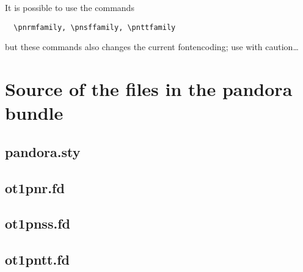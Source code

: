 \documentclass{article}
\begin{document}
\clearpage
It is possible to use the commands
\begin{lstlisting}
  \pnrmfamily, \pnsffamily, \pnttfamily
\end{lstlisting}
but these commands also changes the current fontencoding; use with
caution\dots
\appendix

\section{Source of the files in the pandora bundle}
\label{sec:source}

\subsection{pandora.sty}
\label{sec:pandora.sty}


\subsection{ot1pnr.fd}
\label{sec:ot1pnr.fd}


\subsection{ot1pnss.fd}
\label{sec:ot1pnss.fd}


\subsection{ot1pntt.fd}
\label{sec:ot1pntt.fd}

\end{document}

